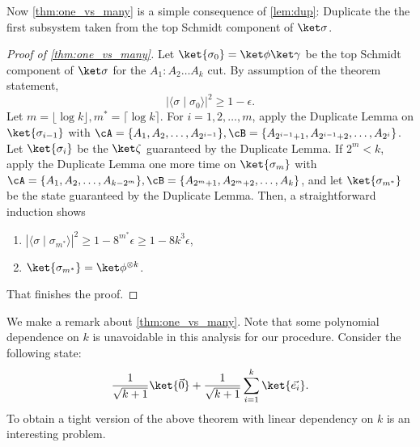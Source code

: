 Now \cref{thm:one_vs_many} is a simple consequence of \cref{lem:dup}: Duplicate the the first subsystem taken from the top Schmidt component of $\ket\sigma$.
\begin{proof}[Proof of \emph{\cref{thm:one_vs_many}}]
Let $\ket{\sigma_0}=\ket\phi\ket\gamma$ be the top Schmidt component of $\ket\sigma$ for the $A_1: A_2\ldots A_k$ cut. By assumption of the theorem statement,
\[
    |\langle \sigma \mid \sigma_0\rangle|^2 \ge 1-\epsilon.
\]
Let $m =\lfloor \log k \rfloor, m^* = \lceil \log k \rceil$. For $i = 1, 2, \ldots, m$, apply the Duplicate Lemma on $\ket{\sigma_{i-1}}$ with $\cA = \{A_1,A_2,\ldots, A_{2^{i-1}}\}, \cB=\{A_{2^{i-1}+1}, A_{2^{i-1}+2},\ldots, A_{2^i}\}$. Let $\ket{\sigma_i}$ be the $\ket\zeta$ guaranteed by the Duplicate Lemma. 
If $2^m < k$, apply the Duplicate Lemma one more time on $\ket{\sigma_m}$ with $\cA=\{A_1, A_2,\ldots, A_{k - 2^m}\}, \cB=\{A_{2^m+1}, A_{2^m+2}, \ldots, A_k\}$, and let $\ket{\sigma_{m^*}}$ be the state guaranteed by the Duplicate Lemma. 
Then, a straightforward induction shows
\begin{enumerate}
    \item  $|\langle \sigma \mid \sigma_{m^*}\rangle|^2 \ge 1 - 8^{m^*}\epsilon\ge 1-8k^3\epsilon$,
    \item  $\ket{\sigma_{m^*}}=\ket\phi^{\otimes k}$.
\end{enumerate}
That finishes the proof.
\end{proof}


We make a remark about \cref{thm:one_vs_many}. Note that some polynomial dependence on $k$ is unavoidable in this analysis for our procedure. Consider the following state:
\[
    \frac{1}{\sqrt {k+1}}\ket{\vec0}+\frac{1}{\sqrt {k+1}}\sum_{i=1}^{k}\ket{\vec{e_i}}. 
\]
To obtain a tight version of the above theorem with linear dependency on $k$ is an interesting problem.

